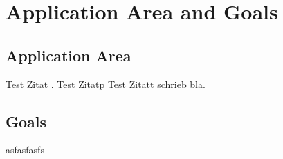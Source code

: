 \chapter{Application Area and Goals}

\section{Application Area}

Test Zitat \cite{statistischesbundesamt2020}.
Test Zitatp \citep{janosi1988}
Test Zitatt \citet{janosi1988} schrieb bla.

\section{Goals}

asfasfasfs